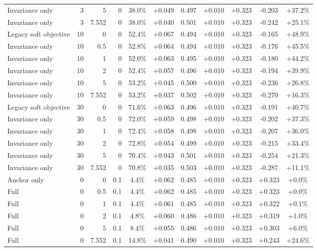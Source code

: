 \begin{table}[htbp]
\begin{tabular}{lrrrccccccc}
Invariance only & 3 & 5 & 0 & 38.0\% & +0.049 & 0.497 & +0.010 & +0.323 & -0.203 & +37.2\% \\
Invariance only & 3 & 7.552 & 0 & 38.0\% & +0.040 & 0.501 & +0.010 & +0.323 & -0.242 & +25.1\% \\
Legacy soft objective & 10 & 0 & 0 & 52.4\% & +0.067 & 0.494 & +0.010 & +0.323 & -0.165 & +48.9\% \\
Invariance only & 10 & 0.5 & 0 & 52.8\% & +0.064 & 0.494 & +0.010 & +0.323 & -0.176 & +45.5\% \\
Invariance only & 10 & 1 & 0 & 52.0\% & +0.063 & 0.495 & +0.010 & +0.323 & -0.180 & +44.2\% \\
Invariance only & 10 & 2 & 0 & 52.4\% & +0.057 & 0.496 & +0.010 & +0.323 & -0.194 & +39.9\% \\
Invariance only & 10 & 5 & 0 & 53.2\% & +0.045 & 0.500 & +0.010 & +0.323 & -0.236 & +26.8\% \\
Invariance only & 10 & 7.552 & 0 & 53.2\% & +0.037 & 0.502 & +0.010 & +0.323 & -0.270 & +16.3\% \\
Legacy soft objective & 30 & 0 & 0 & 71.6\% & +0.063 & 0.496 & +0.010 & +0.323 & -0.191 & +40.7\% \\
Invariance only & 30 & 0.5 & 0 & 72.0\% & +0.059 & 0.498 & +0.010 & +0.323 & -0.202 & +37.3\% \\
Invariance only & 30 & 1 & 0 & 72.4\% & +0.058 & 0.498 & +0.010 & +0.323 & -0.207 & +36.0\% \\
Invariance only & 30 & 2 & 0 & 72.8\% & +0.054 & 0.499 & +0.010 & +0.323 & -0.215 & +33.4\% \\
Invariance only & 30 & 5 & 0 & 70.4\% & +0.043 & 0.501 & +0.010 & +0.323 & -0.254 & +21.3\% \\
Invariance only & 30 & 7.552 & 0 & 70.8\% & +0.035 & 0.503 & +0.010 & +0.323 & -0.287 & +11.1\% \\
Anchor only & 0 & 0 & 0.1 & 4.4\% & +0.062 & 0.485 & +0.010 & +0.323 & +0.323 & +0.0\% \\
Full & 0 & 0.5 & 0.1 & 4.4\% & +0.062 & 0.485 & +0.010 & +0.323 & +0.323 & +0.0\% \\
Full & 0 & 1 & 0.1 & 4.4\% & +0.061 & 0.485 & +0.010 & +0.323 & +0.322 & +0.1\% \\
Full & 0 & 2 & 0.1 & 4.8\% & +0.060 & 0.486 & +0.010 & +0.323 & +0.319 & +1.0\% \\
Full & 0 & 5 & 0.1 & 8.4\% & +0.055 & 0.486 & +0.010 & +0.323 & +0.303 & +6.0\% \\
Full & 0 & 7.552 & 0.1 & 14.8\% & +0.041 & 0.490 & +0.010 & +0.323 & +0.243 & +24.6\% \\

\end{tabular}
\end{table}

